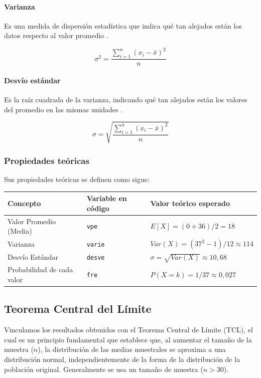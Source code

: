 \documentclass{article}
\begin{document}
\paragraph{Varianza}
Es una medida de dispersión estadística que indica qué tan alejados están los datos respecto al valor promedio \cite{varianza_economipedia}.

$$\sigma^2 = \frac{\sum_{i=1}^{n}(x_i - \bar{x})^2}{n}$$

\paragraph{Desvío estándar}
Es la raíz cuadrada de la varianza, indicando qué tan alejados están los valores del promedio en las mismas unidades \cite{desviacion_estandar_questionpro}.

$$\sigma = \sqrt{\frac{\sum_{i=1}^{n}(x_i - \bar{x})^2}{n}}$$

\subsubsection{Propiedades teóricas}
Sus propiedades teóricas se definen como sigue:

\begin{table}[h]
  \centering
  \begin{tabular}{lll}
    \toprule
    \textbf{Concepto} & \textbf{Variable en código} & \textbf{Valor teórico esperado} \\
    \midrule
    Valor Promedio (Media) & \verb+vpe+ & $E[X] = (0 + 36) / 2 = 18$ \\
    Varianza & \verb+varie+ & $Var(X) = (37^2 - 1) / 12 \approx 114$ \\
    Desvío Estándar & \verb+desve+ & $\sigma = \sqrt{Var(X)} \approx 10,68$ \\
    Probabilidad de cada valor & \verb+fre+ & $P(X = k) = 1/37 \approx 0,027$ \\
    \bottomrule
  \end{tabular}
  \label{tab:propiedades-teoricas}
\end{table}

\subsection{Teorema Central del Límite}
Vinculamos los resultados obtenidos con el Teorema Central de Límite (TCL), el cual es un principio fundamental que 
establece que, al aumentar el tamaño de la muestra ($n$), la distribución de las medias muestrales se aproxima a una 
distribución normal, independientemente de la forma de la distribución de la población original. Generalmente se usa un 
tamaño de muestra ($n > 30$).
\end{document}
